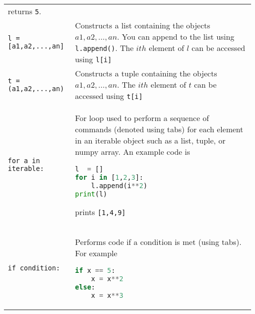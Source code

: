 \begin{tabular}[]{@{}ll@{}}
\begin{minipage}[t]{0.77\columnwidth}
returns \lstinline!5!.\strut
\end{minipage}\tabularnewline
\begin{minipage}[t]{0.17\columnwidth}\raggedright\strut
\lstinline!l = [a1,a2,...,an]!\strut
\end{minipage} & \begin{minipage}[t]{0.77\columnwidth}\raggedright\strut
Constructs a list containing the objects \(a1,a2,...,an\). You can
append to the list using \lstinline!l.append()!. The \(ith\) element of
\(l\) can be accessed using \lstinline!l[i]!\strut
\end{minipage}\tabularnewline
\begin{minipage}[t]{0.17\columnwidth}\raggedright\strut
\lstinline!t =(a1,a2,...,an)!\strut
\end{minipage} & \begin{minipage}[t]{0.77\columnwidth}\raggedright\strut
Constructs a tuple containing the objects \(a1,a2,...,an\). The \(ith\)
element of \(t\) can be accessed using \lstinline!t[i]!\strut
\end{minipage}\tabularnewline
\begin{minipage}[t]{0.17\columnwidth}\raggedright\strut
\lstinline!for a in iterable:!\strut
\end{minipage} & \begin{minipage}[t]{0.77\columnwidth}\raggedright\strut
For loop used to perform a sequence of commands (denoted using tabs) for
each element in an iterable object such as a list, tuple, or numpy
array. An example code is

\begin{lstlisting}[language=Python]
l  = []
for i in [1,2,3]:
    l.append(i**2)
print(l)
\end{lstlisting}

prints \lstinline![1,4,9]!\strut
\end{minipage}\tabularnewline
\begin{minipage}[t]{0.17\columnwidth}\raggedright\strut
\lstinline!if condition:!\strut
\end{minipage} & \begin{minipage}[t]{0.77\columnwidth}\raggedright\strut
Performs code if a condition is met (using tabs). For example

\begin{lstlisting}[language=Python]
if x == 5:
    x = x**2
else:
    x = x**3
\end{lstlisting}


\end{minipage}
\end{tabular}
